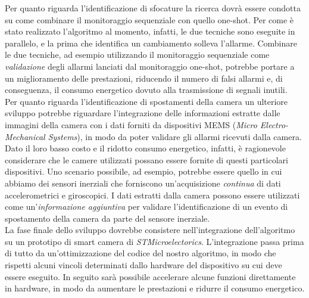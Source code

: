 Per quanto riguarda l'identificazione di sfocature la ricerca dovr\`a essere condotta su come combinare il monitoraggio sequenziale con quello one-shot.
Per come \`e stato realizzato l'algoritmo al momento, infatti, le due tecniche sono eseguite in parallelo, e la prima che identifica un cambiamento solleva l'allarme.
Combinare le due tecniche, ad esempio utilizzando il monitoraggio sequenziale come \textit{validazione} degli allarmi lanciati dal monitoraggio one-shot, potrebbe portare a un miglioramento delle prestazioni, riducendo il numero di falsi allarmi e, di conseguenza, il consumo energetico dovuto alla trasmissione di segnali inutili.\\
Per quanto riguarda l'identificazione di spostamenti della camera un ulteriore sviluppo potrebbe riguardare l'integrazione delle informazioni estratte dalle immagini della camera con i dati forniti da dispositivi MEMS (\textit{Micro Electro-Mechanical Systems}), in modo da poter validare gli allarmi ricevuti dalla camera.
Dato il loro basso costo e il ridotto consumo energetico, infatti, \`e ragionevole considerare che le camere utilizzati possano essere fornite di questi particolari dispositivi.
Uno scenario possibile, ad esempio, potrebbe essere quello in cui abbiamo dei sensori inerziali che forniscono un'acquisizione \textit{continua} di dati accelerometrici e giroscopici. 
I dati estratti dalla camera possono essere utilizzati come un'\textit{informazione aggiuntiva} per validare l'identificazione di un evento di spostamento della camera da parte del sensore inerziale.\\
La fase finale dello sviluppo dovrebbe consistere nell'integrazione dell'algoritmo su un prototipo di smart camera di \textit{STMicroelectorics}.
L'integrazione passa prima di tutto da un'ottimizzazione del codice del nostro algoritmo, in modo che rispetti alcuni vincoli determinati dallo hardware del dispositivo su cui deve essere eseguito.
In seguito sar\`a possibile accelerare alcune funzioni direttamente in hardware, in modo da aumentare le prestazioni e ridurre il consumo energetico.\\



